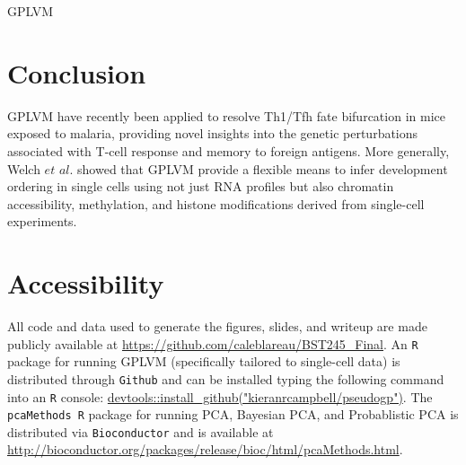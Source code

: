 \documentclass[english, 11pt]{article}\usepackage[]{graphicx}\usepackage[]{color}
\begin{document}
GPLVM \cite{lawrence2004gaussian}




\section{Conclusion}

GPLVM have recently been applied to resolve Th1/Tfh fate bifurcation in mice exposed to malaria, providing novel insights into the genetic perturbations associated with T-cell response and memory to foreign antigens. \cite{lonnberg2017single} More generally, Welch $et$ $al.$ showed that GPLVM provide a flexible means to infer development ordering in single cells using not just RNA profiles but also chromatin accessibility, methylation, and histone modifications derived from single-cell experiments. \cite{welch2017manifold}

\section*{Accessibility}

All code and data used to generate the figures, slides, and writeup are made publicly available at \url{https://github.com/caleblareau/BST245_Final}. An \texttt{R} package for running GPLVM (specifically tailored to single-cell data) is distributed through \texttt{Github} and can be installed typing the following command into an \texttt{R} console: \url{devtools::install_github("kieranrcampbell/pseudogp")}.  The \texttt{pcaMethods R} package for running PCA, Bayesian PCA, and Probablistic PCA is distributed via \texttt{Bioconductor} and is available at \url{http://bioconductor.org/packages/release/bioc/html/pcaMethods.html}.

\newpage{}



{}
\end{document}
